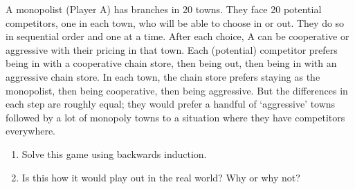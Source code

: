 \documentclass{article}
\begin{document}
A monopolist (Player A) has branches in 20 towns. They face 20 potential competitors, one in each town, who will be able to choose in or out. They do so in sequential order and one at a time. After each choice, A can be cooperative or aggressive with their pricing in that town. Each (potential) competitor prefers being in with a cooperative chain store, then being out, then being in with an aggressive chain store. In each town, the chain store prefers staying as the monopolist, then being cooperative, then being aggressive. But the differences in each step are roughly equal; they would prefer a handful of `aggressive' towns followed by a lot of monopoly towns to a situation where they have competitors everywhere.

\begin{enumerate}
\item Solve this game using backwards induction.
\item Is this how it would play out in the real world? Why or why not?
\end{enumerate}
\end{document}
